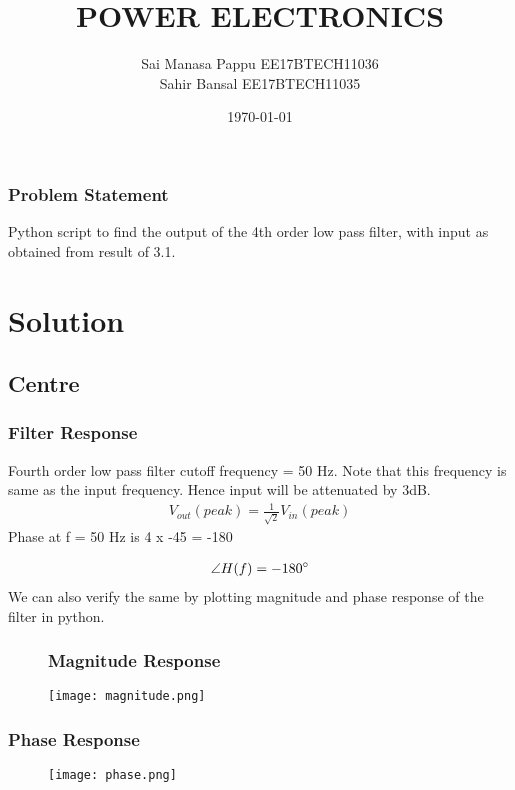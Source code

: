 \documentclass{beamer}
\title{\LARGE  {\bf POWER  ELECTRONICS}}
\author{{Sai Manasa Pappu   EE17BTECH11036}\\  { Sahir Bansal  EE17BTECH11035}}
\date{\today}
\theoremstyle{remark}
\let\vec\mathbf
\numberwithin{equation}{section}
\begin{document}
\begin{frame}
\titlepage
\end{frame}


\begin{frame}
\frametitle{Problem Statement}
Python script to find the output of the 4th order low pass filter, with input as obtained from result of 3.1. 
\bigbreak
\end{frame}

\section{Solution}
\subsection{Centre}
\begin{frame}
\frametitle{Filter Response}
\bigbreak
\bigbreak
\bigbreak
Fourth order low pass filter cutoff frequency = 50 Hz. Note that this frequency is same as the input frequency. 
\bigbreak
Hence input will be attenuated by 3dB. 
\begin{align}
V_{out} (peak) = \frac{1}{\sqrt{2}}V_{in} (peak) 
\end{align}
%
Phase at f = 50 Hz is 4 x -45{\degree} = -180\degree

\begin{align}
\angle H(f) = -180 \degree 
\end{align}
We can also verify the same by plotting magnitude and phase response of the filter in python.
\end{frame}


\begin{frame}
\begin{figure}
\frametitle{Magnitude Response}
\texttt{[image: magnitude.png]}
\label{magnitude.png}
\end{figure}
\end{frame}

\begin{frame}
\frametitle{Phase Response}
\begin{figure}
\centering
\texttt{[image: phase.png]}
\end{figure}
\end{frame}
\end{document}
